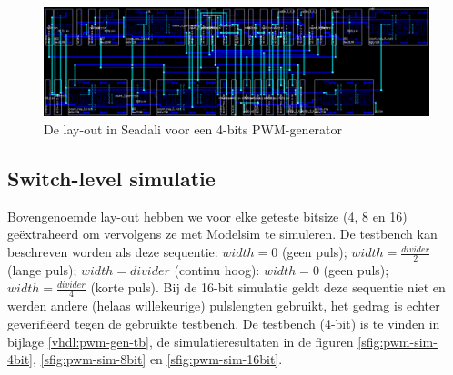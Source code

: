 \documentclass{article}
\begin{document}
\begin{figure}[H]
	\centering
	\includegraphics[width=\textwidth]{resource/pwm_gen_layout.png}
	\caption{De lay-out in Seadali voor een 4-bits PWM-generator}
	\label{fig:pwm-layout}
\end{figure}

\subsection{Switch-level simulatie}
\label{ssec:pwm-impl-switch}
Bovengenoemde lay-out hebben we voor elke geteste bitsize (4, 8 en 16) geëxtraheerd om vervolgens ze met Modelsim te simuleren. De testbench kan beschreven worden als deze sequentie: $width = 0$ (geen puls); $width = \frac{divider}{2}$ (lange puls); $width = divider$ (continu hoog): $width = 0$ (geen puls); $width = \frac{divider}{4}$ (korte puls). Bij de 16-bit simulatie geldt deze sequentie niet en werden andere (helaas willekeurige) pulslengten gebruikt, het gedrag is echter geverifiëerd tegen de gebruikte testbench.
De testbench (4-bit) is te vinden in bijlage \ref{vhdl:pwm-gen-tb}, de simulatieresultaten in de figuren \ref{sfig:pwm-sim-4bit}, \ref{sfig:pwm-sim-8bit} en \ref{sfig:pwm-sim-16bit}.
\end{document}
